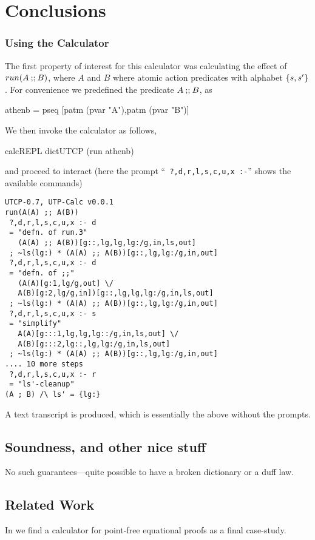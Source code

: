 \section{Conclusions}\label{sec:Conc}

\subsubsection{Using the Calculator}

The first property of interest for this calculator
was calculating the effect of $run(A \mathbin{\mathbf{;\!;}} B)$,
where $A$ and $B$ where atomic action predicates with alphabet $\{{s,s'}\}$.
For convenience we predefined the predicate $A \mathbin{\mathbf{;\!;}} B$, as
\begin{code}
athenb = pseq [patm (pvar "A"),patm (pvar "B")]
\end{code}
We then invoke the calculator as follows, 
\begin{code}
calcREPL dictUTCP (run athenb)
\end{code}
and proceed to interact 
(here the prompt  ``\texttt{ ?,d,r,l,s,c,u,x :-}'' 
shows the available commands)
\begin{verbatim}
UTCP-0.7, UTP-Calc v0.0.1
run(A(A) ;; A(B))
 ?,d,r,l,s,c,u,x :- d
 = "defn. of run.3"
   (A(A) ;; A(B))[g::,lg,lg,lg:/g,in,ls,out]
 ; ~ls(lg:) * (A(A) ;; A(B))[g::,lg,lg:/g,in,out]
 ?,d,r,l,s,c,u,x :- d
 = "defn. of ;;"
   (A(A)[g:1,lg/g,out] \/
   A(B)[g:2,lg/g,in])[g::,lg,lg,lg:/g,in,ls,out]
 ; ~ls(lg:) * (A(A) ;; A(B))[g::,lg,lg:/g,in,out]
 ?,d,r,l,s,c,u,x :- s
 = "simplify"
   A(A)[g:::1,lg,lg,lg::/g,in,ls,out] \/
   A(B)[g:::2,lg::,lg,lg:/g,in,ls,out]
 ; ~ls(lg:) * (A(A) ;; A(B))[g::,lg,lg:/g,in,out]
.... 10 more steps
 ?,d,r,l,s,c,u,x :- r
 = "ls'-cleanup"
(A ; B) /\ ls' = {lg:}
\end{verbatim}
A text transcript is produced,
which is essentially the above
without the prompts.


\subsection{Soundness, and other nice stuff}

No such guarantees---quite possible to have a broken dictionary
or a duff law.

\subsection{Related Work}

In \cite{Bird14} we find a calculator
for point-free equational proofs as a final case-study.

